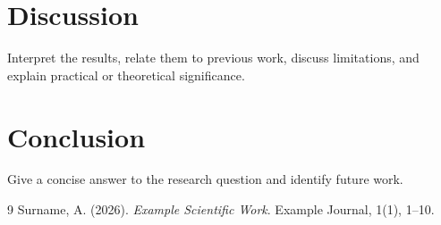 \documentclass[11pt,a4paper]{article}
\begin{document}
\section{Discussion}
\label{sec:discussion}

Interpret the results, relate them to previous work, discuss limitations,
and explain practical or theoretical significance.

\section{Conclusion}
Give a concise answer to the research question and identify future work.

\begin{thebibliography}{9}
Surname, A. (2026). \emph{Example Scientific Work}.
Example Journal, 1(1), 1--10.
\end{thebibliography}
\end{document}
